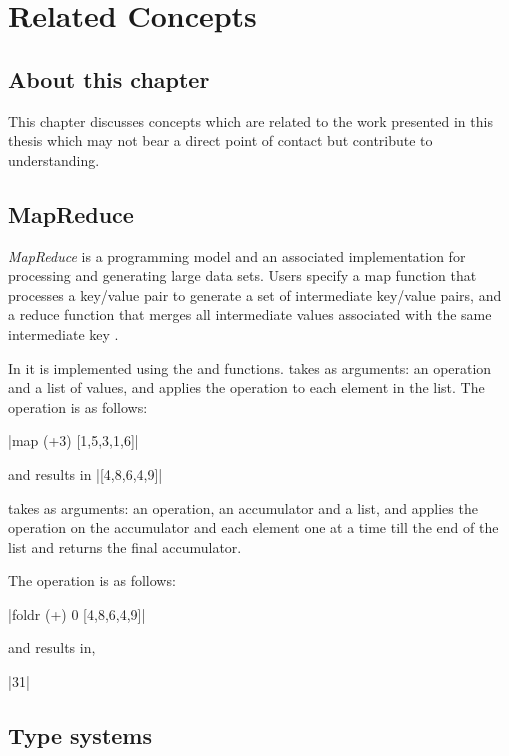 \documentclass[proposal.tex]{subfiles}
\begin{document}
\chapter{Related Concepts}\label{chap:relatedWork}


\section{About this chapter}
This chapter discusses concepts which are related to the work presented in this thesis which may not bear a direct
point of contact but contribute to understanding.

\section{MapReduce}

\textit{MapReduce} is a programming model and an associated implementation for processing and generating large data
sets.
Users specify a map function that processes a key/value pair to generate a set of intermediate key/value pairs, and
a reduce function that merges all intermediate values associated with the same intermediate key
\cite{dean2008mapreduce}.

In  it is implemented using the  and  functions.
 takes as arguments: an operation and a list of values, and applies the operation to each
element in the list.
The  operation is as follows:

|map (+3) [1,5,3,1,6]|

\noindent and results in
|[4,8,6,4,9]|

\noindent {} takes as arguments: an operation, an accumulator and a list, and applies the operation on the
accumulator and each element one at a time till the end of the list and returns the final accumulator.

The  operation is as follows:

|foldr (+) 0 [4,8,6,4,9]|

\noindent and results in,

|31|
 

\section{Type systems}
\end{document}
